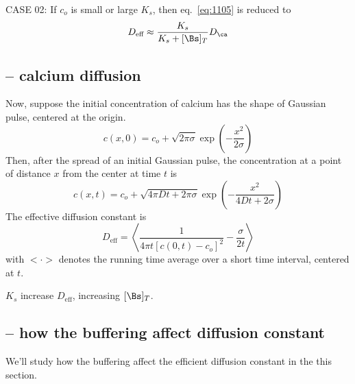 CASE 02: If $c_o$ is small or large $K_s$, then eq.~\eqref{eq:1105} is reduced
to 
\begin{equation}
  \label{eq:1099}
  D_\text{eff} \approx \frac{K_s}{K_s+[\Bs]_T} D_\ca
\end{equation}



\subsection{-- calcium diffusion}

Now, suppose the initial concentration of calcium has the shape of
Gaussian pulse, centered at the origin.
\begin{equation}
  \label{eq:1108}
  c(x,0) = c_o+\sqrt{2\pi\sigma}\exp\left(-\frac{x^2}{2\sigma}\right)
\end{equation}
Then, after the spread of an initial Gaussian pulse, the concentration
at a point of distance $x$ from the center at time $t$ is
\begin{equation}
  \label{eq:1107}
  c(x,t) = c_o + \sqrt{4\pi Dt+2\pi\sigma}\exp\left(-\frac{x^2}{4Dt+2\sigma}\right)
\end{equation}
The effective diffusion constant is
\begin{equation}
  \label{eq:1109}
  D_\text{eff} = \left<\frac{1}{4\pi t[c(0,t)-c_o]^2}-\frac{\sigma}{2t}\right>
\end{equation}
with $<\cdot>$ denotes the running time average over a short time
interval, centered at $t$. 

\begin{framed}
  $K_s$ increase $D_\text{eff}$, increasing $[\Bs]_T$. 
\end{framed}




\subsection{-- how the buffering affect diffusion constant}

We'll study how the buffering affect the efficient diffusion constant in the
this section.

